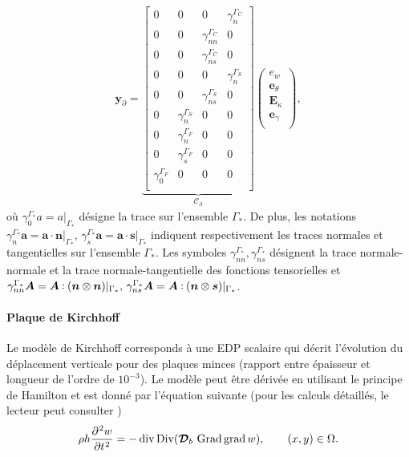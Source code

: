 \begin{equation*}
\begin{aligned}
\bm{y}_\partial = \underbrace{
	\begin{bmatrix}
	{0} & {0} & {0} & \gamma_{n}^{\Gamma_C} \\
	{0} & {0} & \gamma_{nn}^{\Gamma_C} & {0} \\
	{0} & {0} & \gamma_{ns}^{\Gamma_C} & {0} \\
	{0} & {0} & {0} & \gamma_{n}^{\Gamma_S} \\
	{0} & {0} & \gamma_{ns}^{\Gamma_S} & {0} \\
	{0} & \gamma_{n}^{\Gamma_S} & {0} & {0} \\
	{0} & \gamma_{n}^{\Gamma_F} & {0} & {0} \\
	{0} & \gamma_{s}^{\Gamma_F} & {0} & {0} \\
	\gamma_{0}^{\Gamma_F} & {0} & {0} & {0} \\
	\end{bmatrix}}_{\mathcal{C}_\partial}
\begin{pmatrix}
e_w \\
\bm{e}_{\theta} \\
\bm{E}_{\kappa} \\
\bm{e}_{\gamma} \\
\end{pmatrix},
\end{aligned}
\end{equation*}
où $\gamma_{0}^{\Gamma_*} a = a \vert_{\Gamma_*} $ désigne la trace sur l'ensemble $\Gamma_*$. De plus, les notations $\gamma_{n}^{\Gamma_*} \bm{a} = \bm{a} \cdot \bm{n} \vert_{\Gamma_*}, \, \gamma_{s}^{\Gamma_*} \bm{a} = \bm{a} \cdot \bm{s} \vert_{\Gamma_*} $ indiquent respectivement les traces normales et tangentielles sur l'ensemble $\Gamma_* $. Les symboles $\gamma_{nn}^{\Gamma_*}, \gamma_{ns}^{\Gamma_*} $ désignent la trace normale-normale et la trace normale-tangentielle des fonctions tensorielles et $ \gamma_{nn}^{\Gamma_*} \bm{A} = \bm{A} \cddot (\bm{n} \otimes \bm{n}) \vert_{\Gamma_*}, \, \gamma_{ns}^{\Gamma_*} \bm{A} = \bm{A} \cddot (\bm{n} \otimes \bm{s}) \vert_{\Gamma_*} $. 

\paragraph{Plaque de Kirchhoff}
Le modèle de Kirchhoff corresponds à une EDP scalaire qui décrit l'évolution du déplacement verticale pour des plaques minces (rapport entre épaisseur et longueur de l'ordre de $10^{-3}$). Le modèle peut être dérivée en utilisant le principe de Hamilton et est donné par l'équation suivante (pour les calculs détaillés, le lecteur peut consulter \cite[Chapter 3]{reddy2006theory})
\begin{equation*}
\rho h \diffp[2]{w}{t} = - \div\Div (\bm{\mathcal{D}}_b\, \Grad\grad{w}), \qquad (x,y) \in \Omega.
\end{equation*}

